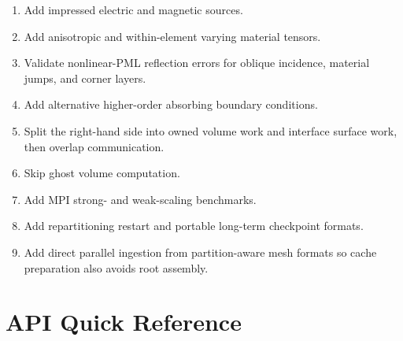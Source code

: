 \documentclass[11pt,oneside]{book}
\begin{document}
\begin{enumerate}[leftmargin=*]
  \item Add impressed electric and magnetic sources.
  \item Add anisotropic and within-element varying material tensors.
  \item Validate nonlinear-PML reflection errors for oblique incidence, material
        jumps, and corner layers.
  \item Add alternative higher-order absorbing boundary conditions.
  \item Split the right-hand side into owned volume work and interface surface
        work, then overlap communication.
  \item Skip ghost volume computation.
  \item Add MPI strong- and weak-scaling benchmarks.
  \item Add repartitioning restart and portable long-term checkpoint formats.
  \item Add direct parallel ingestion from partition-aware mesh formats so
        cache preparation also avoids root assembly.
\end{enumerate}

\appendix

\chapter{API Quick Reference}
\end{document}
